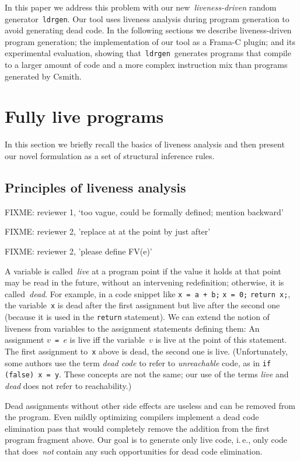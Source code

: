 \documentclass{llncs}
\newcommand\ldrgen{\texttt{ldrgen}}
\begin{document}
In this paper we address this problem with our new~\emph{liveness-driven}
random generator~\ldrgen. Our tool uses liveness analysis during program
generation to avoid generating dead code. In the following sections we
describe liveness-driven program generation; the implementation of our tool
as a Frama-C plugin; and its experimental evaluation, showing that~\ldrgen\
generates programs that compile to a larger amount of code and a more
complex instruction mix than programs generated by Csmith.


\section{Fully live programs}

In this section we briefly recall the basics of liveness analysis and then
present our novel formulation as a set of structural inference rules.

\subsection{Principles of liveness analysis}

FIXME: reviewer 1, `too vague, could be formally defined; mention backward'

FIXME: reviewer 2, 'replace at at the point by just after'

FIXME: reviewer 2, 'please define FV(e)'

A variable is called~\emph{live} at a program point if the value it holds at
that point may be read in the future, without an intervening redefinition;
otherwise, it is called~\emph{dead}.
For example, in a code snippet like \verb|x = a + b;| \verb|x = 0;|
\verb|return x;|, the variable~\verb|x| is dead after the first assignment
but live after the second one (because it is used in the \verb|return|
statement). We can extend the notion of liveness from variables to the
assignment statements defining them: An assignment \(v\)\verb| = |\(e\) is
live iff the variable~\(v\) is live at the point of this statement. The
first assignment to~\verb|x| above is dead, the second one is live.
(Unfortunately, some authors
use the term \emph{dead code} to refer to \emph{unreachable} code, as in
\texttt{if (false) x = y}. These concepts are not the same; our use of the
terms \emph{live} and \emph{dead} does not refer to reachability.)

Dead assignments without other side effects are useless and can be removed
from the program. Even mildly optimizing compilers implement a dead code
elimination pass that would completely remove the addition from the first
program fragment above. Our goal is to generate only live code, i.\,e., only
code that does~\emph{not} contain any such opportunities for dead code
elimination.
\end{document}
